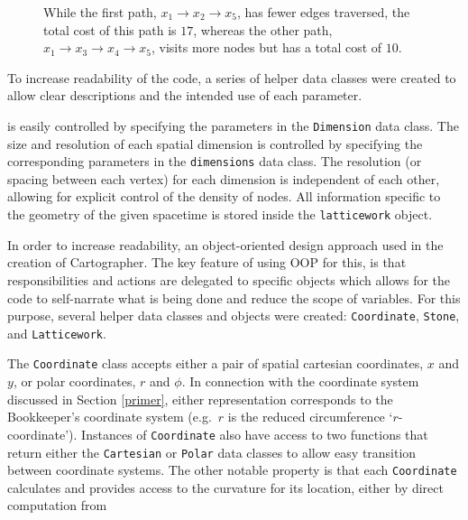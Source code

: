 \documentclass[
]{article}
\begin{document}
\begin{figure}[H]
\begin{subfigure}{0.45\textwidth}
{   
    }
    \end{subfigure}
    \caption{While the first path, $x_1 \rightarrow x_2 \rightarrow x_5$, has fewer edges traversed, the total cost of this path is $17$, whereas the other path, $x_1 \rightarrow x_3 \rightarrow x_4 \rightarrow x_5$, visits more nodes but has a total cost of $10$.}
    \label{fig:WeightGraph2}
\end{figure}

To increase readability of the code, a series of helper data classes
were created to allow clear descriptions and the intended use of each
parameter.

is easily controlled by specifying the parameters in the
\texttt{Dimension} data class. The size and resolution of each spatial
dimension is controlled by specifying the corresponding parameters in
the \texttt{dimensions} data class. The resolution (or spacing between
each vertex) for each dimension is independent of each other, allowing
for explicit control of the density of nodes. All information specific
to the geometry of the given spacetime is stored inside the
\texttt{latticework} object.

In order to increase readability, an object-oriented design approach
used in the creation of Cartographer. The key feature of using OOP for
this, is that responsibilities and actions are delegated to specific
objects which allows for the code to self-narrate what is being done and
reduce the scope of variables. For this purpose, several helper data
classes and objects were created: \texttt{Coordinate}, \texttt{Stone},
and \texttt{Latticework}.

The \texttt{Coordinate} class accepts either a pair of spatial cartesian
coordinates, \(x\) and \(y\), or polar coordinates, \(r\) and \(\phi\).
In connection with the coordinate system discussed in Section
\ref{primer}, either representation corresponds to the Bookkeeper's
coordinate system (e.g.~\(r\) is the reduced circumference
`\(r\)-coordinate'). Instances of \texttt{Coordinate} also have access
to two functions that return either the \texttt{Cartesian} or
\texttt{Polar} data classes to allow easy transition between coordinate
systems. The other notable property is that each \texttt{Coordinate}
calculates and provides access to the curvature for its location, either
by direct computation from
\end{document}
